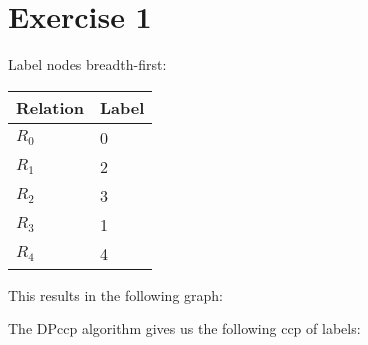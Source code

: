 \documentclass{scrartcl}
\begin{document}
\section*{Exercise 1}

Label nodes breadth-first:

\begin{table}[h]
\begin{tabular}{l|l}
Relation & Label \\ \hline
$R_0$ & 0 \\
$R_1$ & 2 \\
$R_2$ & 3 \\
$R_3$ & 1 \\
$R_4$ & 4
\end{tabular}
\end{table}

This results in the following graph:


The DPccp algorithm gives us the following ccp of labels:
\end{document}
